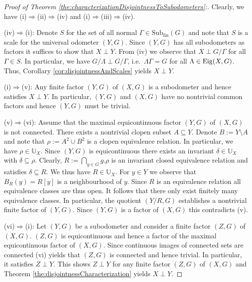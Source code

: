 \documentclass[12pt, reqno]{amsart}
\theoremstyle{definition}
\theoremstyle{remark}
\numberwithin{equation}{section}
\theoremstyle{theorem}
\theoremstyle{remark}
\def\subfin{{\operatorname{Sub_{fin}}}}
\def\Eig{{\rm Eig}}
\begin{document}
\begin{proof}[Proof of Theorem \ref{the:characterizationDisjointnessToSubodometers}:]
    Clearly, we have 
    (i)$\Rightarrow$(ii)$\Rightarrow$(iv) and 
    (i)$\Rightarrow$(iii)$\Rightarrow$(iv).

(iv)$\Rightarrow$(i): 
    Denote $S$ for the set of all normal $\Gamma\in \subfin(G)$ and note that $S$ is a scale for the universal odometer $(Y,G)$. 
    Since $(Y,G)$ has all subodometers as factors it suffices to show that $X\perp Y$.    
    From (iv) we observe that $X\perp G/\Gamma$ for all $\Gamma\in S$. In particular, we have $G/\Lambda\perp G/\Gamma$, i.e.\ $\Lambda\Gamma=G$ for all $\Lambda\in \Eig(X,G)$. 
    Thus, Corollary \ref{cor:disjointnessAndScales} yields $X\perp Y$. 

(i)$\Rightarrow$(v):
    Any finite factor $(Y,G)$ of $(X,G)$ is a subodometer and hence satisfies $X\perp Y$. 
    In particular, $(Y,G)$ and $(X,G)$ have no nontrivial common factors and hence $(Y,G)$ must be trivial. 

(v)$\Rightarrow$(vi): 
    Assume that the maximal equicontinuous factor $(Y,G)$ of $(X,G)$ is not connected. 
    There exists a nontrivial clopen subset $A\subseteq Y$. 
    Denote $B:=Y\setminus A$ and note that $\rho:=A^2\cup B^2$ is a clopen equivalence relation. 
    In particular, we have $\rho\in \mathbb{U}_X$. 
    Since $(Y,G)$ is equicontinuous there exists an invariant $\delta\in \mathbb{U}_X$ with $\delta\subseteq \rho$. 
    Clearly, $R:=\bigcap_{g\in G} g.\rho$ is an invariant closed equivalence relation and satisfies $\delta\subseteq R$. 
    We thus have $R\in \mathbb{U}_X$. 
    For $y\in Y$ we observe that $B_R(y)=R[y]$ is a neighbourhood of $y$. 
    Since $R$ is an equivalence relation all equivalence classes are thus open. 
    It follows that there only exist finitely many equivalence classes.
    In particular, the quotient $(Y/R,G)$ establishes a nontrivial finite factor of $(Y,G)$. Since $(Y,G)$ is a factor of $(X,G)$ this contradicts (v). 

(vi)$\Rightarrow$(i):
    Let $(Y,G)$ be a subodometer and consider a finite factor $(Z,G)$ of $(X,G)$. 
    $(Z,G)$ is equicontinuous and hence a factor of the maximal equicontinuous factor of $(X,G)$. 
    Since continuous images of connected sets are connected (vi) yields that $(Z,G)$ is connected and hence trivial. 
    In particular, it satisfies $Z\perp Y$. 
    This shows $Z\perp Y$ for any finite factor $(Z,G)$ of $(X,G)$ and Theorem \ref{the:disjointnessCharacterization} yields $X\perp Y$. 
\end{proof}
\end{document}
